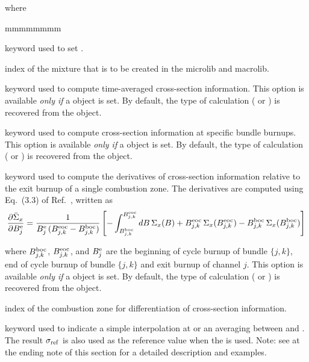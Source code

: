 \noindent where
\begin{ListeDeDescription}{mmmmmmmm}

\item[\moc{MIX}] keyword used to set .

\item[\dusa{imix}] index of the mixture that is to be created in the {\sc microlib} and {\sc macrolib}.

\item[\moc{TIMAV-BURN}] keyword used to compute time-averaged cross-section information. This option is available {\sl only if} a  object is set.
By default, the type of calculation ( or ) is recovered from the  object.

\item[\moc{INST-BURN}] keyword used to compute cross-section information at specific bundle burnups. This option is available {\sl only if} a  object is set.
By default, the type of calculation ( or ) is recovered from the  object.

\item[\moc{AVG-EX-BURN}] keyword used to compute the derivatives of cross-section information relative to the exit burnup of a single combustion zone. The derivatives are computed using Eq.~(3.3) of Ref.~\cite{chambon}, written as
$$
{\partial \bar\Sigma_x\over \partial B_j^{\rm e}}={1\over B_j^{\rm e}\, (B_{j,k}^{\rm eoc}-B_{j,k}^{\rm boc})}
\left[- \int_{B_{j,k}^{\rm boc}}^{B_{j,k}^{\rm eoc}}dB \, \Sigma_x(B)+B_{j,k}^{\rm eoc}\, \Sigma_x(B_{j,k}^{\rm eoc})-B_{j,k}^{\rm boc}\, \Sigma_x(B_{j,k}^{\rm boc})\right]
$$

\noindent where $B_{j,k}^{\rm boc}$, $B_{j,k}^{\rm eoc}$, and $B_j^{\rm e}$ are the beginning of cycle burnup of bundle $\{j,k\}$, end of cycle burnup of bundle $\{j,k\}$ and exit burnup of channel $j$. This option is available {\sl only if} a  object is set.
By default, the type of calculation ( or ) is recovered from the  object.

\item[\dusa{ivarty}] index of the combustion zone for differentiation of cross-section information.

\item[\moc{SET}] keyword used to indicate a simple interpolation at  or an averaging between  and . The result $\sigma_{\rm ref}$ is also used as the reference value when the  is used. Note: see at the ending note of this section for a detailed description and examples.


\end{ListeDeDescription}

